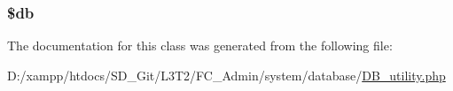 \subsubsection[{\$db}]{\setlength{\rightskip}{0pt plus 5cm}\$db\hspace{0.3cm}{\ttfamily [protected]}}\label{class_c_i___d_b__utility_a1fa3127fc82f96b1436d871ef02be319}


The documentation for this class was generated from the following file\+:\begin{DoxyCompactItemize}
\item 
D\+:/xampp/htdocs/\+S\+D\+\_\+\+Git/\+L3\+T2/\+F\+C\+\_\+\+Admin/system/database/\hyperlink{_d_b__utility_8php}{D\+B\+\_\+utility.\+php}\end{DoxyCompactItemize}
